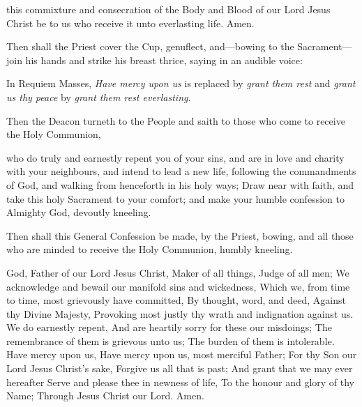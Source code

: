  this commixture and consecration of the Body and Blood of our Lord Jesus Christ be to us who receive it unto everlasting life. Amen.
\begin{rubric}
    Then shall the Priest cover the Cup, genuflect, and---bowing to the Sacrament---join his hands and strike his breast thrice, saying in an audible voice:
\end{rubric}
\begin{rubric}
	In Requiem Masses, \emph{Have mercy upon us} is replaced by \emph{grant them rest} and \emph{grant us thy peace} by \emph{grant them rest everlasting}.
\end{rubric}
\begin{rubric}
    Then the Deacon turneth to the People and saith to those who come to receive the Holy Communion,
\end{rubric}
 who do truly and earnestly repent you of your sins, and are in love and charity with your neighbours, and intend to lead a new life, following the commandments of God, and walking from henceforth in his holy ways; Draw near with faith, and take this holy Sacrament to your comfort; and make your humble confession to Almighty God, devoutly kneeling.
\begin{rubric}
Then shall this General Confession be made, by the Priest, bowing, and all those who are minded to receive the Holy Communion, humbly kneeling.
\end{rubric}
 God, Father of our Lord Jesus Christ, Maker of all things, Judge of all men; We acknowledge and bewail our manifold sins and wickedness, Which we, from time to time, most grievously have committed, By thought, word, and deed, Against thy Divine Majesty, Provoking most justly thy wrath and indignation against us. We do earnestly repent, And are heartily sorry for these our misdoings; The remembrance of them is grievous unto us; The burden of them is intolerable. Have mercy upon us, Have mercy upon us, most merciful Father; For thy Son our Lord Jesus Christ's sake, Forgive us all that is past; And grant that we may ever hereafter Serve and please thee in newness of life, To the honour and glory of thy Name; Through Jesus Christ our Lord. Amen.
